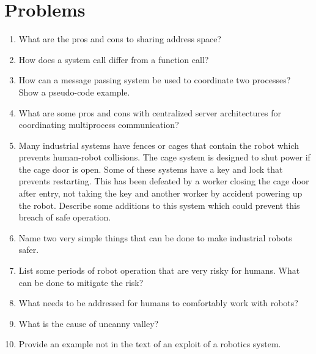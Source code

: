 \hypertarget{problems}{%
\section{Problems}\label{problems}}

\begin{enumerate}
\tightlist
\item
  What are the pros and cons to sharing address space?
\item
  How does a system call differ from a function call?
\item
  How can a message passing system be used to coordinate two processes?
  Show a pseudo-code example.
\item
  What are some pros and cons with centralized server architectures for
  coordinating multiprocess communication?
\item
  Many industrial systems have fences or cages that contain the robot
  which prevents human-robot collisions. The cage system is designed to
  shut power if the cage door is open. Some of these systems have a key
  and lock that prevents restarting. This has been defeated by a worker
  closing the cage door after entry, not taking the key and another
  worker by accident powering up the robot. Describe some additions to
  this system which could prevent this breach of safe operation.
\item
  Name two very simple things that can be done to make industrial robots
  safer.
\item
  List some periods of robot operation that are very risky for humans.
  What can be done to mitigate the risk?
\item
  What needs to be addressed for humans to comfortably work with robots?
\item
  What is the cause of uncanny valley?
\item
  Provide an example not in the text of an exploit of a robotics system.
\end{enumerate}
